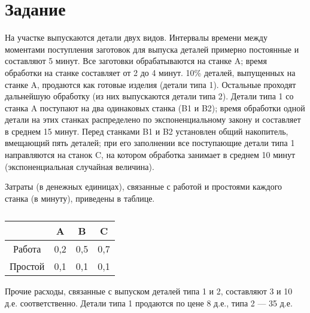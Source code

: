 \section{Задание}

На участке выпускаются детали двух видов. Интервалы времени между моментами поступления заготовок для выпуска деталей примерно постоянные и составляют 5 минут. Все заготовки обрабатываются на станке A; время обработки на станке составляет от 2 до 4 минут.
10\% деталей, выпущенных на станке A, продаются как готовые изделия (детали типа 1). Остальные проходят дальнейшую обработку (из них выпускаются детали типа 2). Детали типа 1 со станка A поступают на два одинаковых станка (B1 и B2); время обработки одной детали на этих станках распределено по экспоненциальному закону и составляет в среднем 15 минут. Перед станками B1 и B2 установлен общий накопитель, вмещающий пять деталей; при его заполнении все поступающие детали типа 1 направляются на станок C, на котором обработка занимает в среднем 10 минут (экспоненциальная случайная величина).

Затраты (в денежных единицах), связанные с работой и простоями каждого станка (в минуту), приведены в таблице. 

\begin{table}[h]
	\caption{}
	\centering
	\begin{tabular}{|c|c|c|c|}
		\hline
		& A & B & C \\ \hline
		Работа & 0,2 & 0,5 & 0,7 \\ \hline
		Простой & 0,1 & 0,1 & 0,1 \\ 
		\hline
	\end{tabular}
\end{table}

Прочие расходы, связанные с выпуском деталей типа 1 и 2, составляют 3 и 10 д.е. соответственно. Детали типа 1 продаются по цене 8 д.е., типа 2 --- 35 д.е.

